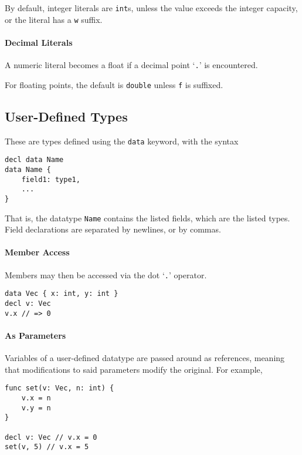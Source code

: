 \documentclass{article}
\begin{document}
By default, integer literals are \texttt{int}s, unless the value exceeds the integer capacity, or the literal has a \texttt{w} suffix.

\paragraph*{Decimal Literals}

A numeric literal becomes a float if a decimal point `\texttt{.}' is encountered.

For floating points, the default is \texttt{double} unless \texttt{f} is suffixed.

\subsection{User-Defined Types}

These are types defined using the \texttt{data} keyword, with the syntax

\begin{lstlisting}[language=CustomLang]
decl data Name
data Name {
    field1: type1,
    ...
}
\end{lstlisting}

That is, the datatype \texttt{Name} contains the listed fields, which are the listed types.
Field declarations are separated by newlines, or by commas.

\paragraph*{Member Access}

Members may then be accessed via the dot `\texttt{.}' operator.

\begin{lstlisting}[language=CustomLang]
data Vec { x: int, y: int }
decl v: Vec
v.x // => 0
\end{lstlisting}

\paragraph*{As Parameters}

Variables of a user-defined datatype are passed around as references, meaning that modifications to said parameters modify the original.
For example,

\begin{lstlisting}[language=CustomLang]
func set(v: Vec, n: int) {
    v.x = n
    v.y = n
}

decl v: Vec // v.x = 0
set(v, 5) // v.x = 5
\end{lstlisting}
\end{document}

